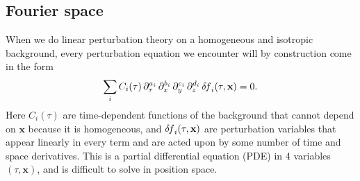 \documentclass[USenglish, thumbmarks]{uiophdthesis} %
\newcommand\deltaf{{\delta\mkern-2mu f}} %
\begin{document}
\subsection{Fourier space}
\label{sec:fourier}

When we do linear perturbation theory on a homogeneous and isotropic background,
every perturbation equation we encounter will by construction come in the form
\begin{equation}
\sum_i C_i(\tau) \, \partial_\tau^{a_i} \, \partial_x^{b_i} \, \partial_y^{c_i} \, \partial_z^{d_i} \, \deltaf_i(\tau, \mathbf{x}) = 0.
\label{eq:pert_real}
\end{equation}
Here $C_i(\tau)$ are time-dependent functions of the background
that cannot depend on $\mathbf{x}$ because it is homogeneous,
and $\deltaf_i(\tau, \mathbf{x})$ are perturbation variables
that appear linearly in every term and are acted upon by some number of time and space derivatives.
This is a partial differential equation (PDE) in 4 variables $(\tau, \mathbf{x})$,
and is difficult to solve in position space.
\end{document}
